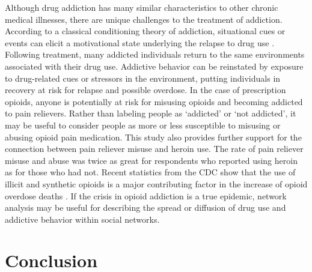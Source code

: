 \documentclass[sigconf]{acmart}
\begin{document}
Although drug addiction has many similar characteristics to other chronic 
medical illnesses, there are unique challenges to the treatment of addiction. 
According to a classical conditioning theory of addiction, situational cues 
or events can elicit a motivational state underlying the relapse to drug use
\cite{shaham03}. Following treatment, many addicted individuals return to the 
same environments associated with their drug use. Addictive behavior can be 
reinstated by exposure to drug-related cues or stressors in the environment,
putting individuals in recovery at risk for relapse and possible overdose. 
In the case of prescription opioids, anyone is potentially at risk for 
misusing opioids and becoming addicted to pain relievers. Rather than labeling 
people as `addicted' or `not addicted', it may be useful to consider people as 
more or less susceptible to misusing or abusing opioid pain medication. This 
study also provides further support for the connection between pain reliever 
misuse and heroin use. The rate of pain reliever misuse and abuse was twice 
as great for respondents who reported using heroin as for those who had not. 
Recent statistics from the CDC show that the use of illicit and synthetic 
opioids is a major contributing factor in the increase of opioid overdose 
deaths \cite{cdc18}. If the crisis in opioid addiction is a true epidemic, 
network analysis may be useful for describing the spread or diffusion of drug 
use and addictive behavior within social networks. 


\section{Conclusion}
\end{document}
